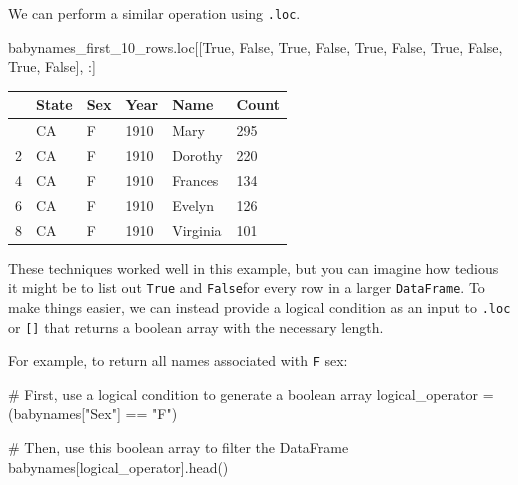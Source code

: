 \documentclass[
  letterpaper,
  DIV=11,
  numbers=noendperiod]{scrreprt}
\newenvironment{Shaded}{\begin{snugshade}}{\end{snugshade}}
\newcommand{\CommentTok}[1]{\textcolor[rgb]{0.37,0.37,0.37}{#1}}
\newcommand{\NormalTok}[1]{\textcolor[rgb]{0.00,0.23,0.31}{#1}}
\newcommand{\OperatorTok}[1]{\textcolor[rgb]{0.37,0.37,0.37}{#1}}
\newcommand{\StringTok}[1]{\textcolor[rgb]{0.13,0.47,0.30}{#1}}
\newcommand{\VariableTok}[1]{\textcolor[rgb]{0.07,0.07,0.07}{#1}}
\begin{document}
We can perform a similar operation using \texttt{.loc}.

\begin{Shaded}
\begin{Highlighting}[]
\NormalTok{babynames\_first\_10\_rows.loc[[}\VariableTok{True}\NormalTok{, }\VariableTok{False}\NormalTok{, }\VariableTok{True}\NormalTok{, }\VariableTok{False}\NormalTok{, }\VariableTok{True}\NormalTok{, }\VariableTok{False}\NormalTok{, }\VariableTok{True}\NormalTok{, }\VariableTok{False}\NormalTok{, }\VariableTok{True}\NormalTok{, }\VariableTok{False}\NormalTok{], :]}
\end{Highlighting}
\end{Shaded}

\begin{longtable}[]{@{}llllll@{}}
\toprule\noalign{}
& State & Sex & Year & Name & Count \\
\midrule\noalign{}
\endhead
\bottomrule\noalign{}
\endlastfoot
0 & CA & F & 1910 & Mary & 295 \\
2 & CA & F & 1910 & Dorothy & 220 \\
4 & CA & F & 1910 & Frances & 134 \\
6 & CA & F & 1910 & Evelyn & 126 \\
8 & CA & F & 1910 & Virginia & 101 \\
\end{longtable}

These techniques worked well in this example, but you can imagine how
tedious it might be to list out \texttt{True} and \texttt{False}for
every row in a larger \texttt{DataFrame}. To make things easier, we can
instead provide a logical condition as an input to \texttt{.loc} or
\texttt{{[}{]}} that returns a boolean array with the necessary length.

For example, to return all names associated with \texttt{F} sex:

\begin{Shaded}
\begin{Highlighting}[]
\CommentTok{\# First, use a logical condition to generate a boolean array}
\NormalTok{logical\_operator }\OperatorTok{=}\NormalTok{ (babynames[}\StringTok{"Sex"}\NormalTok{] }\OperatorTok{==} \StringTok{"F"}\NormalTok{)}

\CommentTok{\# Then, use this boolean array to filter the DataFrame}
\NormalTok{babynames[logical\_operator].head()}
\end{Highlighting}
\end{Shaded}
\end{document}
